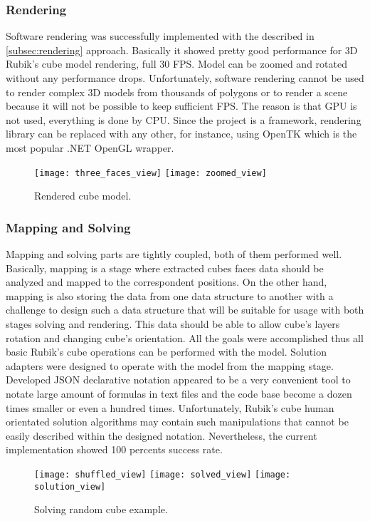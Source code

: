 \documentclass[../../main.tex]{subfiles}
\begin{document}
\subsubsection*{Rendering}

Software rendering was successfully implemented with the described in \ref{subsec:rendering} approach. Basically it showed pretty good performance for 3D Rubik's cube model rendering, full 30 \ac{FPS}. Model can be zoomed and rotated without any performance drops. Unfortunately, software rendering cannot be used to render complex 3D models from thousands of polygons or to render a scene because it will not be possible to keep sufficient FPS. The reason is that \ac{GPU} is not used, everything is done by \ac{CPU}. Since the project is a framework, rendering library can be replaced with any other, for instance, using \ac{OpenTK} which is the most popular .NET \ac{OpenGL} wrapper. 

\begin{figure} [ht!]
    \begin{center}
        \texttt{[image: three\_faces\_view]}
        \texttt{[image: zoomed\_view]}
        \caption{Rendered cube model.}
        \label{fig:rendered_cube_view}
    \end{center}
\end{figure}

\subsubsection*{Mapping and Solving}

Mapping and solving parts are tightly coupled, both of them performed well. Basically, mapping is a stage where extracted cubes faces data should be analyzed and mapped to the correspondent positions. On the other hand, mapping is also storing the data from one data structure to another with a challenge to design such a data structure that will be suitable for usage with both stages solving and rendering. This data should be able to allow cube's layers rotation and changing cube's orientation. All the goals were accomplished thus all basic Rubik's cube operations can be performed with the model.
Solution adapters were designed to operate with the model from the mapping stage. Developed \ac{JSON} declarative notation appeared to be a very convenient tool to notate large amount of formulas in text files and the code base become a dozen times smaller or even a hundred times. Unfortunately, Rubik's cube human orientated solution algorithms may contain such manipulations that cannot be easily described within the designed notation. Nevertheless, the current implementation showed 100 percents success rate.

\begin{figure} [ht!]
    \begin{center}
        \texttt{[image: shuffled\_view]}
        \texttt{[image: solved\_view]}
         \texttt{[image: solution\_view]}
        \caption{Solving random cube example.}
        \label{fig:solving_cube_view}
    \end{center}
\end{figure}
\end{document}
